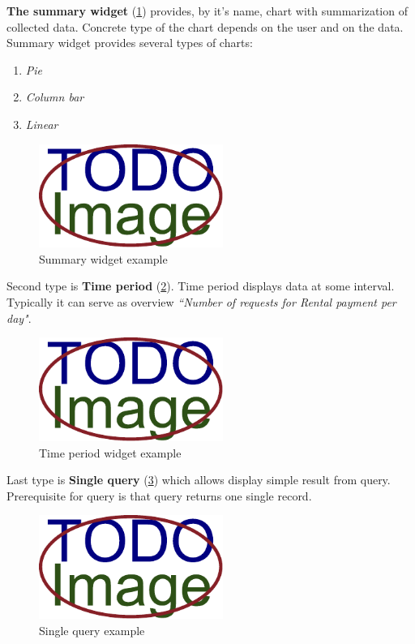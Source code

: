 \documentclass[thesis=B,english]{FITthesis}[2012/06/26]
\begin{document}
     \textbf{The summary widget} (\cref{fig:widget-summary}) provides, by it's name, chart with summarization of collected data. Concrete type of the chart depends on the user and on the data. Summary widget provides several types of charts:
     
     \begin{enumerate}
    	\item \textit{Pie} 
        \item  \textit{Column bar}
        \item \textit{Linear}
    \end{enumerate}
      
      \begin{figure}[h]
          \centering
          \includegraphics[width=6cm,keepaspectratio]{img/TODO-image}
          \caption{Summary widget example}
          \label{fig:widget-summary}
      \end{figure}   
    
   	Second type is \textbf{Time period} (\cref{fig:widget-time-period}). Time period displays data at some interval. Typically it can serve as overview \textit{``Number of requests for Rental payment per day"}.        
      
      \begin{figure}[h]
          \centering
          \includegraphics[width=6cm,keepaspectratio]{img/TODO-image}
          \caption{Time period widget example}
          \label{fig:widget-time-period}
      \end{figure}
    
    Last type is \textbf{Single query} (\cref{fig:widget-single-query}) which allows display simple result from query. Prerequisite for query is that query returns one single record. 
      
      \begin{figure}[h]
          \centering
          \includegraphics[width=6cm,keepaspectratio]{img/TODO-image}
          \caption{Single query example}
           \label{fig:widget-single-query}
      \end{figure}       
    
\end{document}
